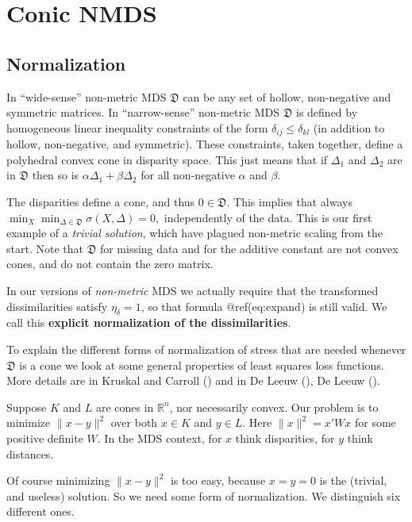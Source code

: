 \documentclass[
  12pt,
  letterpaper,
  DIV=11,
  numbers=noendperiod]{scrreprt}
\theoremstyle{remark}
\begin{document}
\section{Conic NMDS}\label{nmdsconic}

\subsection{Normalization}\label{nmdsnorm}

In ``wide-sense'' non-metric MDS \(\mathfrak{D}\) can be any set of
hollow, non-negative and symmetric matrices. In ``narrow-sense''
non-metric MDS \(\mathfrak{D}\) is defined by homogeneous linear
inequality constraints of the form \(\delta_{ij}\leq\delta_{kl}\) (in
addition to hollow, non-negative, and symmetric). These constraints,
taken together, define a polyhedral convex cone in disparity space. This
just means that if \(\Delta_1\) and \(\Delta_2\) are in \(\mathfrak{D}\)
then so is \(\alpha\Delta_1+\beta\Delta_2\) for all non-negative
\(\alpha\) and \(\beta\).

The disparities define a cone, and thus \(0\in\mathfrak{D}\). This
implies that always
\(\min_X\min_{\Delta\in\mathfrak{D}}\sigma(X,\Delta)=0,\) independently
of the data. This is our first example of a \emph{trivial solution},
which have plagued non-metric scaling from the start. Note that
\(\mathfrak{D}\) for missing data and for the additive constant are not
convex cones, and do not contain the zero matrix.

In our versions of \emph{non-metric} MDS we actually require that the
transformed dissimilarities satisfy \(\eta_\delta=1\), so that formula
@ref(eq:expand) is still valid. We call this \textbf{explicit
normalization of the dissimilarities}.

To explain the different forms of normalization of stress that are
needed whenever \(\mathfrak{D}\) is a cone we look at some general
properties of least squares loss functions. More details are in Kruskal
and Carroll () and in De Leeuw
(), De Leeuw
().

Suppose \(K\) and \(L\) are cones in \(\mathbb{R}^n\), nor necessarily
convex. Our problem is to minimize \(\|x-y\|^2\) over both \(x\in K\)
and \(y\in L\). Here \(\|x\|^2=x'Wx\) for some positive definite \(W\).
In the MDS context, for \(x\) think disparities, for \(y\) think
distances.

Of course minimizing \(\|x-y\|^2\) is too easy, because \(x=y=0\) is the
(trivial, and useless) solution. So we need some form of normalization.
We distinguish six different ones.
\end{document}
